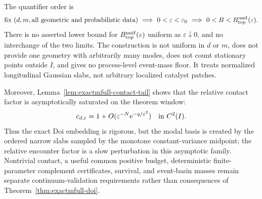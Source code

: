 \begin{remark}
\label{rem:exactmfull-scope}
The quantifier order is
\begin{equation}
 \text{fix }(d,m,\text{all geometric and probabilistic data})
 \ \Longrightarrow\ 
 0<\varepsilon<\varepsilon_0
 \ \Longrightarrow\ 
 0<B<B_{\rm top}^{\rm unif}(\varepsilon).
 \label{eq:exactmfull-quantifier-order}
\end{equation}
There is no asserted lower bound for
\(B_{\rm top}^{\rm unif}(\varepsilon)\) uniform as
\(\varepsilon\downarrow0\), and no interchange of the two limits.  The
construction is not uniform in \(d\) or \(m\), does not provide one geometry
with arbitrarily many modes, does not count stationary points outside \(I\),
and gives no process-level event-mass floor.  It treats normalized
longitudinal Gaussian slabs, not arbitrary localized catalyst patches.

Moreover, Lemma~\ref{lem:exactmfull-contact-tail} shows that the relative
contact factor is asymptotically saturated on the theorem window:
\begin{equation}
 c_{d,\varepsilon}=1
 +O(\varepsilon^{-N}\mathrm e^{-q/\varepsilon^2})
 \quad\text{in }C^2(I).
 \label{eq:exactmfull-saturated-contact}
\end{equation}
Thus the exact Doi embedding is rigorous, but the modal basis is created by
the ordered narrow slabs sampled by the monotone constant-variance midpoint;
the relative encounter factor is a slow perturbation in this asymptotic
family.  Nontrivial contact, a useful common positive budget, deterministic
finite-parameter complement certificates, survival, and event-basin masses
remain separate continuum-validation requirements rather than consequences
of Theorem~\ref{thm:exactmfull-doi}.
\end{remark}
